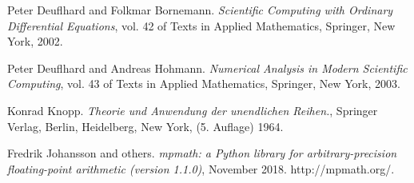 \begin{thebibliography}{9}
Peter Deuflhard and Folkmar Bornemann. {\it Scientific Computing with Ordinary Differential Equations}, vol. 42 of Texts in Applied Mathematics, Springer, New York, 2002.

Peter Deuflhard and Andreas Hohmann. {\it Numerical Analysis in Modern Scientific Computing}, vol. 43 of Texts in Applied Mathematics, Springer, New York, 2003. 

Konrad Knopp. {\it Theorie und Anwendung der unendlichen Reihen.}, Springer Verlag, Berlin, Heidelberg, New York, (5. Auflage) 1964. 

Fredrik Johansson and others. {\it mpmath: a Python library for arbitrary-precision floating-point arithmetic (version 1.1.0)}, November 2018. http://mpmath.org/.
\end{thebibliography}
